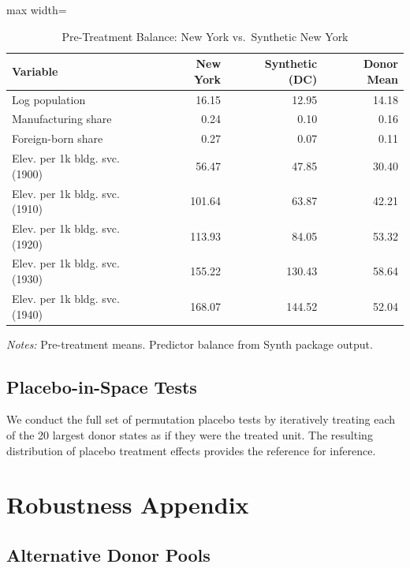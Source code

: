 \documentclass[12pt]{article}
\begin{document}
\begin{table}[H]
\centering
\caption{Pre-Treatment Balance: New York vs.\ Synthetic New York}
\label{tab:scm_balance_app}
\begin{threeparttable}
\begin{adjustbox}{max width=\textwidth}
\begin{tabular}{lrrr}
\toprule
Variable & New York & Synthetic (DC) & Donor Mean \\
\midrule
Log population & 16.15 & 12.95 & 14.18 \\
Manufacturing share & 0.24 & 0.10 & 0.16 \\
Foreign-born share & 0.27 & 0.07 & 0.11 \\
Elev. per 1k bldg. svc. (1900) & 56.47 & 47.85 & 30.40 \\
Elev. per 1k bldg. svc. (1910) & 101.64 & 63.87 & 42.21 \\
Elev. per 1k bldg. svc. (1920) & 113.93 & 84.05 & 53.32 \\
Elev. per 1k bldg. svc. (1930) & 155.22 & 130.43 & 58.64 \\
Elev. per 1k bldg. svc. (1940) & 168.07 & 144.52 & 52.04 \\
\bottomrule
\end{tabular}
\end{adjustbox}
\begin{tablenotes}[flushleft]
\small
\item \textit{Notes:} Pre-treatment means. Predictor balance from Synth package output.
\end{tablenotes}
\end{threeparttable}
\end{table}

\subsection{Placebo-in-Space Tests}

We conduct the full set of permutation placebo tests by iteratively treating each of the 20 largest donor states as if they were the treated unit. The resulting distribution of placebo treatment effects provides the reference for inference.

\section{Robustness Appendix}

\subsection{Alternative Donor Pools}
\end{document}
